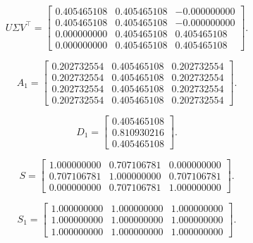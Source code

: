 \noindent\begin{minipage}[t]{.48\textwidth}\footnotesize\setlength{\arraycolsep}{3pt}\[ U\Sigma V^\top=\begin{bmatrix}0.405465108 & 0.405465108 & -0.000000000\\0.405465108 & 0.405465108 & -0.000000000\\0.000000000 & 0.405465108 & 0.405465108\\0.000000000 & 0.405465108 & 0.405465108\end{bmatrix}. \]
\end{minipage}\hfill\begin{minipage}[t]{.48\textwidth}\footnotesize\setlength{\arraycolsep}{3pt}\[ A_1=\begin{bmatrix}0.202732554 & 0.405465108 & 0.202732554\\0.202732554 & 0.405465108 & 0.202732554\\0.202732554 & 0.405465108 & 0.202732554\\0.202732554 & 0.405465108 & 0.202732554\end{bmatrix}. \]
\end{minipage}\par
\noindent\begin{minipage}[t]{.48\textwidth}\footnotesize\setlength{\arraycolsep}{3pt}\[ D_1=\begin{bmatrix}0.405465108\\0.810930216\\0.405465108\end{bmatrix}. \]
\end{minipage}\hfill\begin{minipage}[t]{.48\textwidth}\footnotesize\setlength{\arraycolsep}{3pt}\[ S=\begin{bmatrix}1.000000000 & 0.707106781 & 0.000000000\\0.707106781 & 1.000000000 & 0.707106781\\0.000000000 & 0.707106781 & 1.000000000\end{bmatrix}. \]
\end{minipage}\par
\noindent\begin{minipage}[t]{.48\textwidth}\footnotesize\setlength{\arraycolsep}{3pt}\[ S_1=\begin{bmatrix}1.000000000 & 1.000000000 & 1.000000000\\1.000000000 & 1.000000000 & 1.000000000\\1.000000000 & 1.000000000 & 1.000000000\end{bmatrix}. \]
\end{minipage}\par
